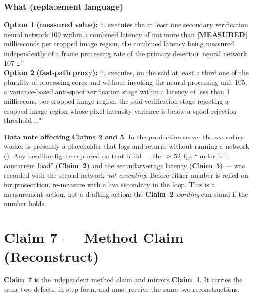 \documentclass[12pt,a4paper]{article}
\newcommand{\clm}[1]{\textbf{Claim~#1}}
\begin{document}
\subsubsection{What (replacement language)}
\begin{whatbox}
\textbf{Option 1 (measured value):} ``\ldots executes the at least one secondary verification
neural network 109 within a combined latency of not more than \textbf{[MEASURED]}
milliseconds per cropped image region, the combined latency being measured independently of a
frame processing rate of the primary detection neural network 107 \ldots''
\\[6pt]
\textbf{Option 2 (fast-path proxy):} ``\ldots executes, on the said at least a third one of
the plurality of processing cores and without invoking the neural processing unit 105, a
variance-based anti-spoof verification stage within a latency of less than 1 millisecond per
cropped image region, the said verification stage rejecting a cropped image region whose
pixel-intensity variance is below a spoof-rejection threshold \ldots''
\end{whatbox}

\begin{advisory}
\textbf{Data note affecting Claims 2 and 5.} In the production server the secondary worker is
presently a placeholder that logs and returns without running a network
(). Any headline figure captured on that build --- the
$\approx 52$~fps ``under full concurrent load'' (\clm{2}) and the secondary-stage latency
(\clm{5}) --- was recorded with the second network \emph{not executing}. Before either number
is relied on for prosecution, re-measure with a live secondary in the loop. This is a
measurement action, not a drafting action; the \clm{2} \emph{wording} can stand if the number
holds.
\end{advisory}

\section{Claim 7 --- Method Claim (Reconstruct)}\label{sec:c7}

\clm{7} is the independent method claim and mirrors \clm{1}. It carries the same two defects,
in step form, and must receive the same two reconstructions.
\end{document}
